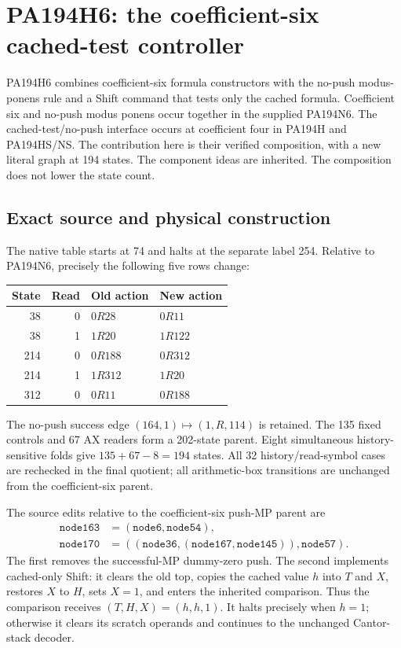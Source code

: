 \section{PA194H6: the coefficient-six cached-test controller}
\label{sec:h6}

PA194H6 combines coefficient-six formula constructors with the no-push
modus-ponens rule and a Shift command that tests only the cached formula.
Coefficient six and no-push modus ponens occur together in the supplied
PA194N6.  The cached-test/no-push interface occurs at coefficient four in
PA194H and PA194HS/NS.  The contribution here is their verified composition,
with a new literal graph at 194 states.  The component ideas are inherited.
The composition does not lower the state count.

\subsection{Exact source and physical construction}

The native table starts at 74 and halts at the separate label 254.
Relative to PA194N6, precisely the following five rows change:
\begin{center}
\begin{tabular}{rrll}
\toprule State & Read & Old action & New action\\\midrule
38&0&$0R28$&$0R11$\\
38&1&$1R20$&$1R122$\\
214&0&$0R188$&$0R312$\\
214&1&$1R312$&$1R20$\\
312&0&$0R11$&$0R188$\\\bottomrule
\end{tabular}
\end{center}
The no-push success edge $(164,1)\mapsto(1,R,114)$ is retained.
The 135 fixed controls and 67 AX readers form a 202-state parent.
Eight simultaneous history-sensitive folds give $135+67-8=194$ states.
All 32 history/read-symbol cases are rechecked in the final quotient;
all arithmetic-box transitions are unchanged from the coefficient-six parent.

The source edits relative to the coefficient-six push-MP parent are
\[
\begin{split}
 \mathtt{node163}&=(\mathtt{node6},\mathtt{node54}),\\
 \mathtt{node170}&=((\mathtt{node36},
              (\mathtt{node167},\mathtt{node145})),\mathtt{node57}).
\end{split}
\]
The first removes the successful-MP dummy-zero push.  The second implements
cached-only Shift: it clears the old top, copies the cached value $h$ into
$T$ and $X$, restores $X$ to $H$, sets $X=1$, and enters the inherited
comparison.  Thus the comparison receives $(T,H,X)=(h,h,1)$.
It halts precisely when $h=1$; otherwise it clears its scratch operands
and continues to the unchanged Cantor-stack decoder.


